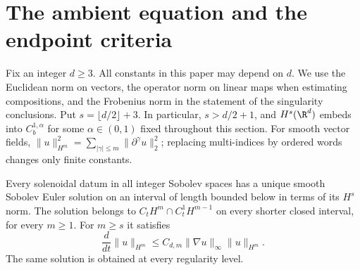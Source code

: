 \section{The ambient equation and the endpoint criteria}
Fix an integer $d\geq3$. All constants in this paper may depend on $d$.
We use the Euclidean norm on vectors, the operator norm on linear maps when
estimating compositions, and the Frobenius norm in the statement of the
singularity conclusions. Put $s=\lfloor d/2\rfloor+3$. In particular,
$s>d/2+1$, and $H^s(\R^d)$ embeds into $C^{1,\alpha}_b$ for some
$\alpha\in(0,1)$ fixed throughout this section. For smooth vector fields,
$\|u\|_{H^m}^2=\sum_{|\gamma|\leq m}\|\partial^\gamma u\|_2^2$;
replacing multi-indices by ordered words changes only finite constants.

\begin{lemma}\label{lem:local}
Every solenoidal datum in all integer Sobolev spaces has a unique smooth
Sobolev Euler solution on an interval of length bounded below in terms of
its $H^s$ norm. The solution belongs to
$C_tH^m\cap C^1_tH^{m-1}$ on every shorter closed interval, for every
$m\geq1$. For $m\geq s$ it satisfies
\begin{equation}\label{eq:tame-energy}
 \frac{d}{dt}\|u\|_{H^m}\leq C_{d,m}\|\nabla u\|_\infty\|u\|_{H^m}.
\end{equation}
The same solution is obtained at every regularity level.
\end{lemma}
